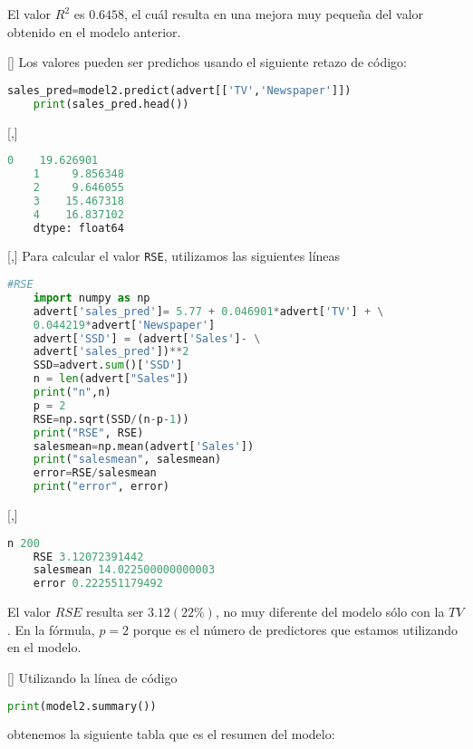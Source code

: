 El valor $R^{2}$ es $0.6458$, el cuál resulta en una mejora muy pequeña del valor obtenido en el modelo anterior.

[]{}
Los valores pueden ser predichos usando el siguiente retazo de código:
\begin{lstlisting}[language=Python]
	sales_pred=model2.predict(advert[['TV','Newspaper']])
	print(sales_pred.head())
\end{lstlisting}

[,]{}
\begin{lstlisting}[language=Python]
	0    19.626901
	1     9.856348
	2     9.646055
	3    15.467318
	4    16.837102
	dtype: float64
\end{lstlisting}

[,]{}
Para calcular el valor \texttt{RSE}, utilizamos las siguientes líneas
\begin{lstlisting}[language=Python]
	#RSE
	import numpy as np
	advert['sales_pred']= 5.77 + 0.046901*advert['TV'] + \
	0.044219*advert['Newspaper']
	advert['SSD'] = (advert['Sales']- \
	advert['sales_pred'])**2
	SSD=advert.sum()['SSD']
	n = len(advert["Sales"])
	print("n",n)
	p = 2
	RSE=np.sqrt(SSD/(n-p-1))
	print("RSE", RSE)
	salesmean=np.mean(advert['Sales'])
	print("salesmean", salesmean)
	error=RSE/salesmean
	print("error", error)
\end{lstlisting}

[,]{}
\begin{lstlisting}[language=Python]
	n 200
	RSE 3.12072391442
	salesmean 14.022500000000003
	error 0.222551179492
\end{lstlisting}


El valor $RSE$ resulta ser $3.12 (22\%)$, no muy diferente del modelo sólo con la $TV$. En la fórmula, $p=2$ porque es el número de predictores que estamos utilizando en el modelo.

[]
Utilizando la línea de código
\begin{lstlisting}[language=Python]
	print(model2.summary())
\end{lstlisting} obtenemos la siguiente tabla que es el resumen del modelo:


